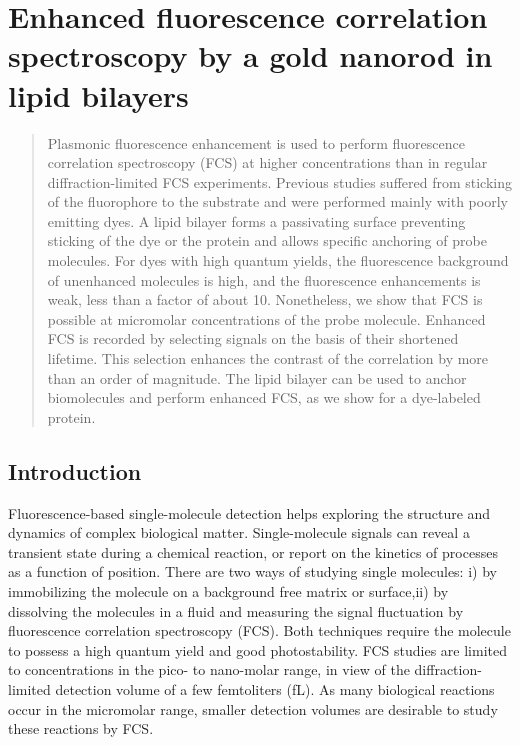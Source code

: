 \chapter{Enhanced fluorescence correlation spectroscopy by a gold nanorod in lipid bilayers}
\label{chapter:EFCS}

\graphicspath{{chapters/c2_bilayer_efcs/figure/}}
\begin{abstract}
	Plasmonic fluorescence enhancement is used to perform fluorescence correlation spectroscopy (FCS) at higher concentrations than in regular diffraction-limited FCS experiments.
	Previous studies suffered from sticking of the fluorophore to the substrate and were performed mainly with poorly emitting dyes.
	A lipid bilayer forms a passivating surface preventing sticking of the dye or the protein and allows specific anchoring of probe molecules.
	For dyes with high quantum yields, the fluorescence background of unenhanced molecules is high, and the fluorescence enhancements is weak, less than a factor of about 10.
	Nonetheless, we show that FCS is possible at micromolar concentrations of the probe molecule.
	Enhanced FCS is recorded by selecting signals on the basis of their shortened lifetime.
	This selection enhances the contrast of the correlation by more than an order of magnitude.
	The lipid bilayer can be used to anchor biomolecules and perform enhanced FCS, as we show for a dye-labeled protein.
\end{abstract}
\newpage

\section{Introduction}
Fluorescence-based single-molecule detection helps exploring the structure and dynamics of complex biological matter.\cite{moerner1999illuminating,weiss1999fluorescence}
Single-molecule signals can reveal a transient state during a chemical reaction, or report on the kinetics of processes as a function of position.
There are two ways of studying single molecules: i) by immobilizing the molecule on a background free matrix or surface,ii) by dissolving the molecules in a fluid and measuring the signal fluctuation by fluorescence correlation spectroscopy (FCS).\cite{magde1972thermodynamic}
Both techniques require the molecule to possess a high quantum yield and good photostability.
FCS studies are limited to concentrations in the pico- to nano-molar range, in view of the diffraction-limited detection volume of a few femtoliters (fL).
As many biological reactions occur in the micromolar range\cite{craighead2006future}, smaller detection volumes are desirable to study these reactions by FCS.


